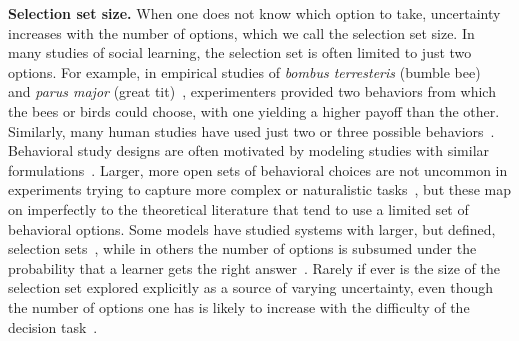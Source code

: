\documentclass[letterpaper,11.5pt]{scrartcl}
\newcommand{\mt}[1]{{\textcolor{myorange} {({\tiny MT:} #1)}}}
\newcommand{\cm}[1]{{\textcolor{mypurple} {({\tiny CM:} #1)}}}
\begin{document}
\textbf{Selection set size.}
When one does not know which option to take, uncertainty increases with the number of options, which we call the selection set size.
In many studies of social learning, the selection set is often limited to just two options.  For example, in empirical studies of \emph{bombus
terresteris} (bumble bee)~\cite{Baracchi2018} and \emph{parus major} (great
tit)~\cite{Aplin2017}, experimenters provided two behaviors from which the bees or birds
could choose, with one yielding a higher payoff than the other. %
Similarly, many human studies have used just two or three possible
behaviors~\cite{McElreath2005,Morgan2012, Toyokawa2019}. Behavioral study designs are
often motivated by modeling studies with similar formulations~\cite{Rogers1988,boyd1995does,Feldman1996,
perreault2012bayesian}.
Larger, more open sets of behavioral
choices are not uncommon in experiments trying to capture more complex or
naturalistic tasks~\cite{derex2013, wasielewski2014}, but these map on
imperfectly to the theoretical literature that tend to use a limited set of behavioral options.
Some models have studied systems with
larger, but defined, selection sets~\cite{Rendell2010, lindstrom2016co}, while in others the
number of options is subsumed under the probability that a learner gets the right answer~\cite{Feldman1996,Enquist2007}.
Rarely if ever is the size of the selection set explored explicitly as a source of varying uncertainty, even though the number of options one has is likely to increase with the difficulty of the decision task~\cite{haynes2009testing,white2009testing}.  
\end{document}
